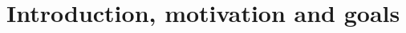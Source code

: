 \documentclass[../main.tex]{subfiles}
\begin{document}
\chapter{Introduction, motivation and goals} %
\label{cha:intro}

\end{document}
